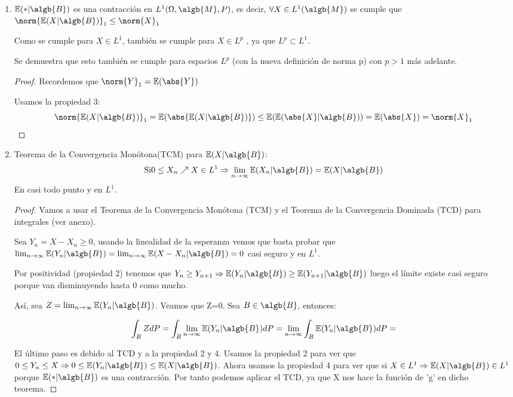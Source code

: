 \documentclass{apuntes}
\begin{document}
\begin{enumerate}
\begin{proof}
\end{proof}
\item $\mathbb{E}(*|\algb{B})$ es una contracción en $L^1(\Omega, \algb{M},P)$, es decir, $\forall X \in L^1(\algb{M})$ se cumple que $\norm{\mathbb{E}(X|\algb{B})}_1 \leq \norm{X}_1$

\obs Como se cumple para $X \in L^1$, también se cumple para $X \in L^p$ , ya que $L^p \subset L^1$.

\obs Se demuestra que esto también se cumple para espacios $L^p$ (con la nueva definición de norma p) con $p>1$ más adelante.

\begin{proof}

Recordemos que $\norm{Y}_1 = \mathbb{E}(\abs{Y})$

Usamos la propiedad 3:
\[\norm{\mathbb{E}(X|\algb{B})}_1=
\mathbb{E}(\abs{\mathbb{E}(X|\algb{B})}) \leq \mathbb{E}(\mathbb{E}(\abs{X}|\algb{B})) = \mathbb{E}(\abs{X}) = \norm{X}_1
\]
\end{proof}
\item Teorema de la Convergencia Monótona(TCM) para $\mathbb{E}(X|\algb{B})$:
\[
\text{Si} 0\leq X_n \nearrow X \in L^1 \Rightarrow \lim_{n \rightarrow \infty} \mathbb{E}(X_n|\algb{B}) = \mathbb{E}(X|\algb{B})
\]
En casi todo punto y en $L^1$.

\begin{proof}
Vamos a usar el Teorema de la Convergencia Monótona (TCM) y el Teorema de la Convergencia Dominada (TCD) para integrales (ver anexo).

Sea $Y_n=X-X_n \geq 0$, usando la linealidad de la esperanza vemos que basta probar que $\lim_{n \rightarrow \infty} \mathbb{E}(Y_n|\algb{B})= \lim_{n \rightarrow \infty} \mathbb{E}(X-X_n|\algb{B}) = 0$ casi seguro y en $L^1$.

Por positividad (propiedad 2) tenemos que $Y_n \geq Y_{n+1} \Rightarrow \mathbb{E}(Y_n|\algb{B}) \geq \mathbb{E}(Y_{n+1}|\algb{B})$ luego el límite existe casi seguro porque van disminuyendo hasta 0 como mucho.

Así, sea $Z=\lim_{n \rightarrow \infty} \mathbb{E}(Y_n|\algb{B})$. Veamos que Z=0. Sea $B \in \algb{B}$, entonces:

\[
\int_B ZdP= \int_B \lim_{n \rightarrow \infty}\mathbb{E}(Y_n|\algb{B})dP= \lim_{n \rightarrow \infty}\int_B \mathbb{E}(Y_n|\algb{B})dP =
\]

El último paso es debido al TCD y a la propiedad 2 y 4. Usamos la propiedad 2 para ver que $0 \leq Y_n \leq X \Rightarrow 0 \leq \mathbb{E}(Y_n|\algb{B}) \leq \mathbb{E}(X|\algb{B})$.  Ahora usamos la propiedad 4 para ver que si $X\in L^1 \Rightarrow \mathbb{E}(X|\algb{B})\in L^1$ porque $\mathbb{E}(*|\algb{B})$ es una contracción. Por tanto podemos aplicar el TCD, ya que X nos hace la función de 'g' en dicho teorema.


\end{proof}
\end{enumerate}
\end{document}
